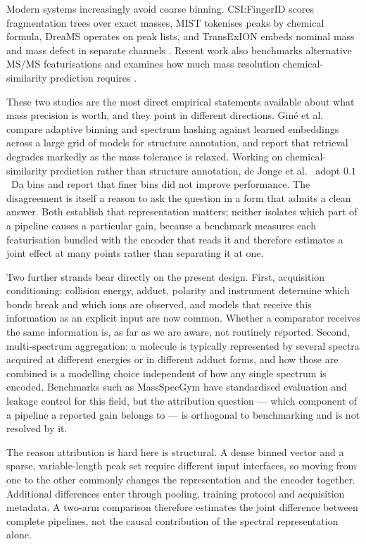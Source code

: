 \documentclass[11pt]{article}
\begin{document}
Modern systems increasingly avoid coarse binning. CSI:FingerID scores fragmentation trees over exact masses, MIST tokenises peaks by chemical formula, DreaMS operates on peak lists, and TransExION embeds nominal mass and mass defect in separate channels \cite{buithi2024transexion}. Recent work also benchmarks alternative MS/MS featurisations \cite{gine2026benchmarking} and examines how much mass resolution chemical-similarity prediction requires \cite{dejonge2026cross}.

These two studies are the most direct empirical statements available about what mass precision is worth, and they point in different directions. Gin\'e et al.\ \cite{gine2026benchmarking} compare adaptive binning and spectrum hashing against learned embeddings across a large grid of models for structure annotation, and report that retrieval degrades markedly as the mass tolerance is relaxed. Working on chemical-similarity prediction rather than structure annotation, de Jonge et al.\ \cite{dejonge2026cross} adopt $0.1$~Da bins and report that finer bins did not improve performance. The disagreement is itself a reason to ask the question in a form that admits a clean answer. Both establish that representation matters; neither isolates which part of a pipeline causes a particular gain, because a benchmark measures each featurisation bundled with the encoder that reads it and therefore estimates a joint effect at many points rather than separating it at one.

Two further strands bear directly on the present design. First, acquisition conditioning: collision energy, adduct, polarity and instrument determine which bonds break and which ions are observed, and models that receive this information as an explicit input are now common. Whether a comparator receives the same information is, as far as we are aware, not routinely reported. Second, multi-spectrum aggregation: a molecule is typically represented by several spectra acquired at different energies or in different adduct forms, and how those are combined is a modelling choice independent of how any single spectrum is encoded. Benchmarks such as MassSpecGym \cite{bushuiev2024massspecgym} have standardised evaluation and leakage control for this field, but the attribution question --- which component of a pipeline a reported gain belongs to --- is orthogonal to benchmarking and is not resolved by it.

The reason attribution is hard here is structural. A dense binned vector and a sparse, variable-length peak set require different input interfaces, so moving from one to the other commonly changes the representation and the encoder together. Additional differences enter through pooling, training protocol and acquisition metadata. A two-arm comparison therefore estimates the joint difference between complete pipelines, not the causal contribution of the spectral representation alone.
\end{document}
